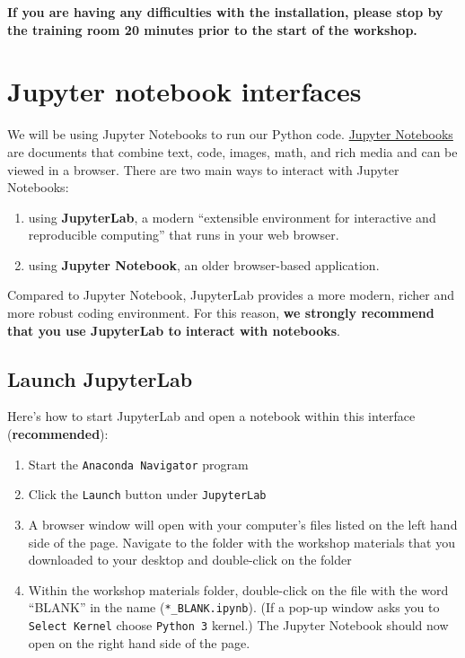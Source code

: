 \documentclass[
]{book}
\providecommand{\tightlist}{%
  \setlength{\itemsep}{0pt}\setlength{\parskip}{0pt}}
\begin{document}
\textbf{If you are having any difficulties with the installation, please stop by the training room 20 minutes prior to the start of the workshop.}

\hypertarget{jupyter-notebook-interfaces}{%
\section{Jupyter notebook interfaces}\label{jupyter-notebook-interfaces}}

We will be using Jupyter Notebooks to run our Python code. \href{https://jupyter-notebook.readthedocs.io/en/stable/}{Jupyter Notebooks} are documents that combine text, code, images, math, and rich media and can be viewed in a browser. There are two main ways to interact with Jupyter Notebooks:

\begin{enumerate}
\def\labelenumi{\arabic{enumi}.}
\tightlist
\item
  using \textbf{JupyterLab}, a modern ``extensible environment for interactive and reproducible computing'' that runs in your web browser.
\item
  using \textbf{Jupyter Notebook}, an older browser-based application.
\end{enumerate}

Compared to Jupyter Notebook, JupyterLab provides a more modern, richer and more robust coding environment. For this reason, \textbf{we strongly recommend that you use JupyterLab to interact with notebooks}.

\hypertarget{launch-jupyterlab}{%
\subsection{Launch JupyterLab}\label{launch-jupyterlab}}

Here's how to start JupyterLab and open a notebook within this interface (\textbf{recommended}):

\begin{enumerate}
\def\labelenumi{\arabic{enumi}.}
\tightlist
\item
  Start the \texttt{Anaconda\ Navigator} program
\item
  Click the \texttt{Launch} button under \texttt{JupyterLab}
\item
  A browser window will open with your computer's files listed on the left hand side of the page. Navigate to the folder with the workshop materials that you downloaded to your desktop and double-click on the folder
\item
  Within the workshop materials folder, double-click on the file with the word ``BLANK'' in the name (\texttt{*\_BLANK.ipynb}). (If a pop-up window asks you to \texttt{Select\ Kernel} choose \texttt{Python\ 3} kernel.) The Jupyter Notebook should now open on the right hand side of the page.
\end{enumerate}
\end{document}

